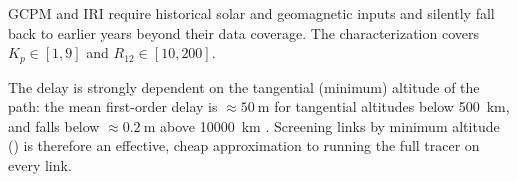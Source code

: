 \begin{description}[style=nextline, leftmargin=1.2em]
  \item[Empirical-model validity.]
    GCPM and IRI require historical solar and geomagnetic inputs and silently
    fall back to earlier years beyond their data coverage.  The characterization
    covers $K_p \in [1,9]$ and $R_{12} \in [10,200]$.

  \item[Magnitudes.]
    The delay is strongly dependent on the tangential (minimum) altitude of the
    path: the mean first-order delay is $\approx \SI{50}{\meter}$ for tangential
    altitudes below \SI{500}{\kilo\meter}, and falls below
    $\approx \SI{0.2}{\meter}$ above \SI{10000}{\kilo\meter}
    \citep{iiyama2026gcpm}.  Screening links by minimum altitude
    () is therefore an effective, cheap
    approximation to running the full tracer on every link.
\end{description}
